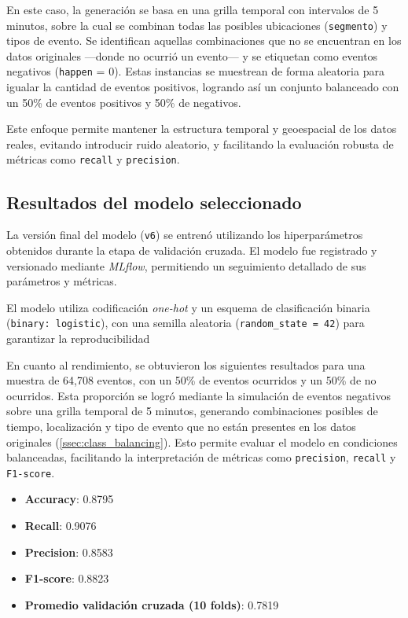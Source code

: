 \documentclass[12pt]{article}
\begin{document}
En este caso, la generación se basa en una grilla temporal con intervalos de 5 minutos, sobre la cual se combinan todas las posibles ubicaciones (\texttt{segmento}) y tipos de evento. Se identifican aquellas combinaciones que no se encuentran en los datos originales —donde no ocurrió un evento— y se etiquetan como eventos negativos (\texttt{happen} = 0). Estas instancias se muestrean de forma aleatoria para igualar la cantidad de eventos positivos, logrando así un conjunto balanceado con un 50\% de eventos positivos y 50\% de negativos.

Este enfoque permite mantener la estructura temporal y geoespacial de los datos reales, evitando introducir ruido aleatorio, y facilitando la evaluación robusta de métricas como \texttt{recall} y \texttt{precision}.


\subsection{Resultados del modelo seleccionado}

La versión final del modelo (\texttt{v6}) se entrenó utilizando los hiperparámetros obtenidos durante la etapa de validación cruzada. El modelo fue registrado y versionado mediante \textit{MLflow}, permitiendo un seguimiento detallado de sus parámetros y métricas.

El modelo utiliza codificación \textit{one-hot} y un esquema de clasificación binaria (\texttt{binary: logistic}), con una semilla aleatoria (\texttt{random\_state = 42}) para garantizar la reproducibilidad \citep{geron2019hands}


\noindent En cuanto al rendimiento, se obtuvieron los siguientes resultados para una muestra de 64,708 eventos, con un 50\% de eventos ocurridos y un 50\% de no ocurridos. Esta proporción se logró mediante la simulación de eventos negativos sobre una grilla temporal de 5 minutos, generando combinaciones posibles de tiempo, localización y tipo de evento que no están presentes en los datos originales (\cref{ssec:class_balancing}). Esto permite evaluar el modelo en condiciones balanceadas, facilitando la interpretación de métricas como \texttt{precision}, \texttt{recall} y \texttt{F1-score}.

\begin{itemize}
    \item \textbf{Accuracy}: 0.8795
    \item \textbf{Recall}: 0.9076
    \item \textbf{Precision}: 0.8583
    \item \textbf{F1-score}: 0.8823
    \item \textbf{Promedio validación cruzada (10 folds)}: 0.7819
\end{itemize}
\end{document}
